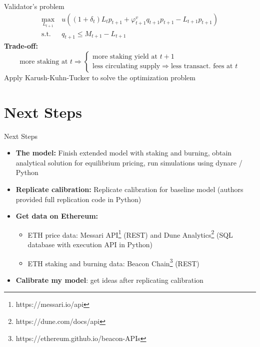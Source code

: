 \documentclass{beamer}
\begin{document}
\begin{frame}{Validator's problem}
\begin{align}
\max_{L_{t+1}}\ & u((1+\delta_t) L_t p_{t+1} + \varphi_{t+1}^v q_{t+1} p_{t+1} - L_{t+1}p_{t+1})\\
    \text{s.t. } & q_{t+1} \leq M_{t+1} - L_{t+1} \nonumber
\end{align}
\textbf{Trade-off:}
\[
\text{more staking at } t \Rightarrow
\begin{cases}
    \text{more staking yield at } t+1\\
    \text{less circulating supply} \Rightarrow \text{less transact. fees at } t
\end{cases}
\]
Apply Karush-Kuhn-Tucker to solve the optimization problem
\end{frame}


\section{Next Steps}
\begin{frame}{Next Steps}
    \begin{itemize}
        \item \textbf{The model:} Finish extended model with staking and burning, obtain analytical solution for equilibrium pricing, run simulations using dynare / Python\\
        \item \textbf{Replicate calibration:} Replicate calibration for baseline model (authors provided full replication code in Python)
        \item \textbf{Get data on Ethereum:} 
        \begin{itemize}
            \item ETH price data: Messari API\footnote{https://messari.io/api} (REST) and Dune Analytics\footnote{https://dune.com/docs/api} (SQL database with execution API in Python)
            \item ETH staking and burning data: Beacon Chain\footnote{https://ethereum.github.io/beacon-APIs} (REST)
        \end{itemize}
        \item \textbf{Calibrate my model}: get ideas after replicating calibration
    \end{itemize}
\end{frame}

\end{document}
